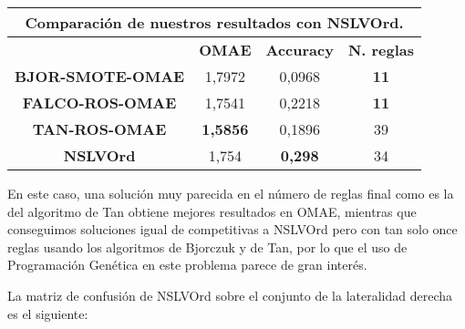 \begin{table}[H]
\centering
\begin{tabular}{|cccc|}
\hline
\multicolumn{4}{|c|}{\textbf{Comparación de nuestros resultados con NSLVOrd.}}    \\ \hline
\multicolumn{1}{|c|}{\textbf{}}                & \multicolumn{1}{c|}{\textbf{OMAE}}    & \multicolumn{1}{c|}{\textbf{Accuracy}} & \textbf{N. reglas} \\ \hline
\multicolumn{1}{|c|}{\textbf{BJOR-SMOTE-OMAE}} & \multicolumn{1}{c|}{1,7972}          & \multicolumn{1}{c|}{0,0968}           & \textbf{11}        \\ \hline
\multicolumn{1}{|c|}{\textbf{FALCO-ROS-OMAE}}  & \multicolumn{1}{c|}{1,7541}          & \multicolumn{1}{c|}{0,2218}           & \textbf{11}        \\ \hline
\multicolumn{1}{|c|}{\textbf{TAN-ROS-OMAE}}    & \multicolumn{1}{c|}{\textbf{1,5856}}          & \multicolumn{1}{c|}{0,1896}            & 39                 \\ \hline
\multicolumn{1}{|c|}{\textbf{NSLVOrd}}        & \multicolumn{1}{c|}{1,754} & \multicolumn{1}{c|}{\textbf{0,298}}           & 34              \\ \hline
\end{tabular}%
\end{table}

En este caso, una solución muy parecida en el número de reglas final como es la del algoritmo de Tan obtiene mejores resultados en OMAE, mientras que conseguimos soluciones igual de competitivas a NSLVOrd pero con tan solo once reglas usando los algoritmos de Bjorczuk y de Tan, por lo que el uso de Programación Genética en este problema parece de gran interés.


La matriz de confusión de NSLVOrd sobre el conjunto de la lateralidad derecha es el siguiente:

